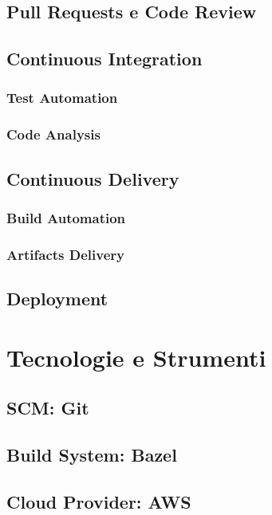 \documentclass[a4paper,12pt]{report}
\begin{document}
	\subsection{Pull Requests e Code Review}
	
	\subsection{Continuous Integration}
	
	\subsubsection{Test Automation}
	
	\subsubsection{Code Analysis}
	
	\subsection{Continuous Delivery}
	
	\subsubsection{Build Automation}
	
	\subsubsection{Artifacts Delivery}
	
	\subsection{Deployment}
	
	\section{Tecnologie e Strumenti}
	
	\subsection{SCM: Git}
	
	\subsection{Build System: Bazel}
	
	\subsection{Cloud Provider: AWS}
	
\end{document}
